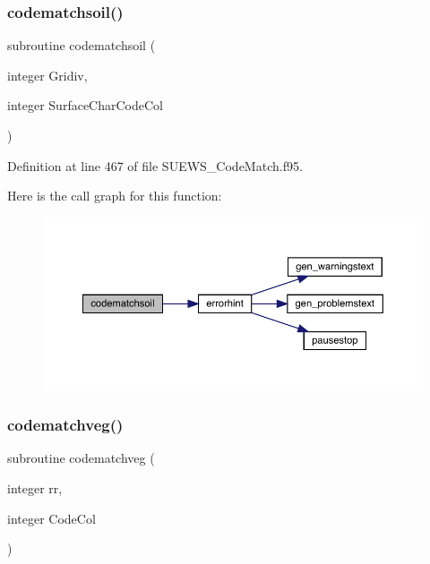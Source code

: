 \subsubsection{\texorpdfstring{codematchsoil()}{codematchsoil()}}
{\footnotesize\ttfamily subroutine codematchsoil (\begin{DoxyParamCaption}\item[{integer}]{Gridiv,  }\item[{integer}]{Surface\+Char\+Code\+Col }\end{DoxyParamCaption})}



Definition at line 467 of file S\+U\+E\+W\+S\+\_\+\+Code\+Match.\+f95.

Here is the call graph for this function\+:\nopagebreak
\begin{figure}[H]
\begin{center}
\leavevmode
\includegraphics[width=350pt]{_s_u_e_w_s___code_match_8f95_a2121726d61441ffb4d7f4cfb991b3e48_cgraph}
\end{center}
\end{figure}
\mbox{\label{_s_u_e_w_s___code_match_8f95_ac0f963de4bead7bb4cd003951e8b3592}} 
\subsubsection{\texorpdfstring{codematchveg()}{codematchveg()}}
{\footnotesize\ttfamily subroutine codematchveg (\begin{DoxyParamCaption}\item[{integer}]{rr,  }\item[{integer}]{Code\+Col }\end{DoxyParamCaption})}



